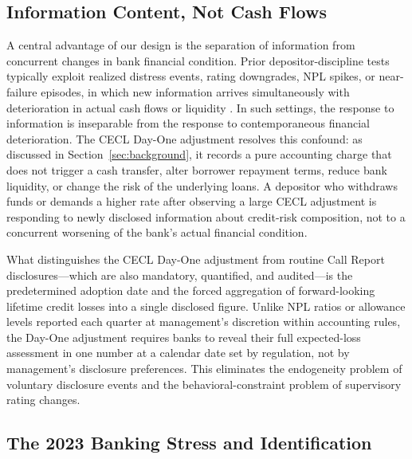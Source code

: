 \subsection{Information Content, Not Cash Flows}
\label{sec:identification:mechanism}

A central advantage of our design is the separation of information from
concurrent changes in bank financial condition.  Prior depositor-discipline
tests typically exploit realized distress events, rating downgrades, NPL
spikes, or near-failure episodes, in which new information arrives
simultaneously with deterioration in actual cash flows or liquidity
\citep{flannery1996evidence, martinez2001depositors, iyer2016tale}.
In such settings, the response to information is inseparable from the
response to contemporaneous financial deterioration.  The CECL Day-One
adjustment resolves this confound: as discussed in
Section~\ref{sec:background}, it records a pure accounting charge that does
not trigger a cash transfer, alter borrower repayment terms, reduce bank
liquidity, or change the risk of the underlying loans.  A depositor who
withdraws funds or demands a higher rate after observing a large CECL
adjustment is responding to newly disclosed information about credit-risk
composition, not to a concurrent worsening of the bank's actual financial
condition.

What distinguishes the CECL Day-One adjustment from routine Call Report
disclosures---which are also mandatory, quantified, and audited---is the
predetermined adoption date and the forced aggregation of forward-looking
lifetime credit losses into a single disclosed figure.  Unlike NPL ratios or
allowance levels reported each quarter at management's discretion within
accounting rules, the Day-One adjustment requires banks to reveal their full
expected-loss assessment in one number at a calendar date set by regulation,
not by management's disclosure preferences.  This eliminates the endogeneity
problem of voluntary disclosure events and the behavioral-constraint problem
of supervisory rating changes.

\subsection{The 2023 Banking Stress and Identification}
\label{sec:identification:stress}

